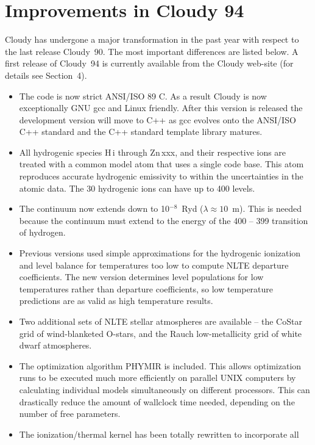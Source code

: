\section{Improvements in Cloudy 94}

Cloudy has undergone a major transformation in the past year with respect to
the last release Cloudy~90. The most important differences are listed below. A
first release of Cloudy~94 is currently available from the Cloudy web-site (for
details see Section~4).

\begin{itemize}
\item
  The code is now strict ANSI/ISO 89 C. As a result Cloudy is now
    exceptionally GNU gcc and Linux friendly. After this version is released
    the development version will move to C++ as gcc evolves onto the ANSI/ISO
    C++ standard and the C++ standard template library matures.
\item
  All hydrogenic species H\,{\sc i} through Zn\,{\sc xxx}, and their
    respective ions are treated with a common model atom that uses a single
    code base. This atom reproduces accurate hydrogenic emissivity to within
    the uncertainties in the atomic data. The 30 hydrogenic ions can have up
    to 400 levels.
\item
  The continuum now extends down to 10$^{-8}$~Ryd ($\lambda\approx 10$~m).
    This is needed because the continuum must extend to the energy of the 400
    -- 399 transition of hydrogen.
\item
  Previous versions used simple approximations for the hydrogenic ionization
    and level balance for temperatures too low to compute NLTE departure
    coefficients. The new version determines level populations for low
    temperatures rather than departure coefficients, so low temperature
    predictions are as valid as high temperature results.
\item
  Two additional sets of NLTE stellar atmospheres are available -- the CoStar
    grid of wind-blanketed O-stars, and the Rauch low-metallicity grid of
    white dwarf atmospheres.
\item
  The optimization algorithm PHYMIR is included. This allows optimization runs
    to be executed much more efficiently on parallel UNIX computers by
    calculating individual models simultaneously on different processors. This
    can drastically reduce the amount of wallclock time needed, depending on
    the number of free parameters.
\item
  The ionization/thermal kernel has been totally rewritten to incorporate all

\end{itemize}
